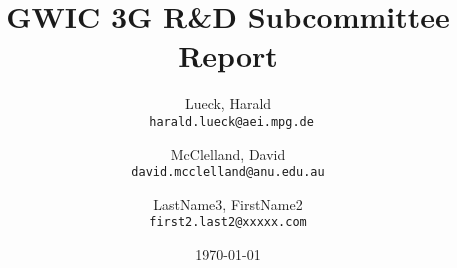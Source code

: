 \documentclass[url,11pt]{article}
\def\biblio{}
\begin{document}
\dosecttoc

\def\biblio{} %
\togglefalse{standalone}


\title{GWIC 3G R\&D Subcommittee Report }

\author{
  Lueck, Harald\\
  \texttt{
  harald.lueck@aei.mpg.de}
  \and
  McClelland, David\\
  \texttt{david.mcclelland@anu.edu.au}
  \and
  LastName3, FirstName2\\
  \texttt{first2.last2@xxxxx.com}
}

\date{\today}
\maketitle
\tableofcontents
\pagebreak



\clearpage


\clearpage


\clearpage


\clearpage


\clearpage

\clearpage

\clearpage

\clearpage

\clearpage


\clearpage

\clearpage

\clearpage

\clearpage



\clearpage
{}
\appendix




\clearpage
{}





%
%
\end{document}
